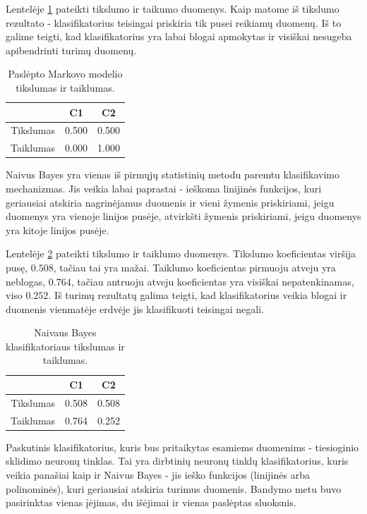 \documentclass[]{vgtuef}
\begin{document}
Lentelėje \ref{table:hmm_scores} pateikti tikslumo ir taikumo
duomenys. Kaip matome iš tikslumo rezultato - klasifikatorius
teisingai priskiria tik pusei reikiamų duomenų. Iš to galime teigti,
kad klasifikatorius yra labai blogai apmokytas ir visiškai nesugeba
apibendrinti turimų duomenų.

\begin{table}[t]
  \centering
  \caption{Paslėpto Markovo modelio tikslumas ir taiklumas.}
  \label{table:hmm_scores}
  \begin{tabular}{|c|c|c|} \hline
    & C1 & C2 \\ \hline
    Tikslumas & 0.500 & 0.500 \\ \hline
    Taiklumas & 0.000 & 1.000 \\ \hline
  \end{tabular}
\end{table}

Naivus Bayes yra vienas iš pirmųjų statistinių metodu paremtu
klasifikavimo mechanizmas. Jis veikia labai paprastai - ieškoma
linijinės funkcijos, kuri geriausiai atskiria nagrinėjamus duomenis ir
vieni žymenis priskiriami, jeigu duomenys yra vienoje linijos pusėje,
atvirkšti žymenis priskiriami, jeigu duomenys yra kitoje linijos
pusėje. 

Lentelėje \ref{table:nb_scores} pateikti tikslumo ir taiklumo
duomenys. Tikslumo koeficientas viršija pusę, $0.508$, tačiau tai yra
mažai. Taiklumo koeficientas pirmuoju atveju yra neblogas, $0.764$,
tačiau antruoju atveju koeficientas yra visiškai nepatenkinamas, viso
$0.252$. Iš turimų rezultatų galima teigti, kad klasifikatorius veikia
blogai ir duomenis vienmatėje erdvėje jis klasifikuoti teisingai negali.

\begin{table}[t]
  \centering
  \caption{Naivaus Bayes klasifikatoriaus tikslumas ir taiklumas.}
  \label{table:nb_scores}
  \begin{tabular}{|c|c|c|} \hline
    & C1 & C2 \\ \hline
    Tikslumas & 0.508 & 0.508 \\ \hline
    Taiklumas & 0.764 & 0.252 \\ \hline
  \end{tabular}
\end{table}

Paskutinis klasifikatorius, kuris bus pritaikytas esamiems duomenims -
tiesioginio sklidimo neuronų tinklas. Tai yra dirbtinių neuronų tinklų
klasifikatorius, kuris veikia panašiai kaip ir Naivus Bayes - jis
ieško funkcijos (linijinės arba polinominės), kuri geriausiai atskiria
turimus duomenis. Bandymo metu buvo pasirinktas vienas įėjimas, du
išėjimai ir vienas paslėptas sluoksnis. 
\end{document}
